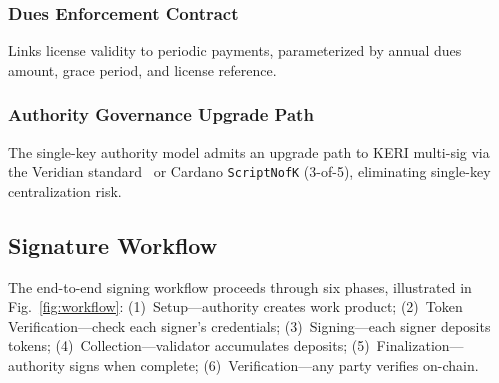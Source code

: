 \documentclass[conference,10pt]{IEEEtran}
\begin{document}
\subsubsection{Dues Enforcement Contract} Links license validity to periodic payments, parameterized by annual dues amount, grace period, and license reference.

\subsubsection{Authority Governance Upgrade Path} The single-key authority model admits an upgrade path to KERI multi-sig via the Veridian standard~\cite{veridian2025} or Cardano \texttt{ScriptNofK} (3-of-5), eliminating single-key centralization risk.

\subsection{Signature Workflow}

The end-to-end signing workflow proceeds through six phases, illustrated in Fig.~\ref{fig:workflow}: (1)~Setup---authority creates work product; (2)~Token Verification---check each signer's credentials; (3)~Signing---each signer deposits tokens; (4)~Collection---validator accumulates deposits; (5)~Finalization---authority signs when complete; (6)~Verification---any party verifies on-chain.
\end{document}
